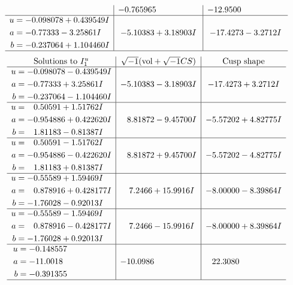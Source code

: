 \documentclass[1p]{elsarticle_modified}
\theoremstyle{definition}
\newcommand{\I}{\sqrt{-1}}
\begin{document}
$$\begin{array}{c|c|c}
 & -0.765965\phantom{ +0.000000I} & -12.9500\phantom{ +0.000000I} \\ \hline\begin{aligned}
u &= -0.098078 + 0.439549 I \\
a &= -0.77333 - 3.25861 I \\
b &= -0.237064 + 1.104460 I\end{aligned}
 & -5.10383 + 3.18903 I & -17.4273 - 3.2712 I\\
 \hline 
 \end{array}$$\newpage$$\begin{array}{c|c|c}  
\text{Solutions to }I^u_{1}& \I (\text{vol} + \sqrt{-1}CS) & \text{Cusp shape}\\
 \hline 
\begin{aligned}
u &= -0.098078 - 0.439549 I \\
a &= -0.77333 + 3.25861 I \\
b &= -0.237064 - 1.104460 I\end{aligned}
 & -5.10383 - 3.18903 I & -17.4273 + 3.2712 I \\ \hline\begin{aligned}
u &= \phantom{-}0.50591 + 1.51762 I \\
a &= -0.954886 + 0.422620 I \\
b &= \phantom{-}1.81183 - 0.81387 I\end{aligned}
 & \phantom{-}8.81872 - 9.45700 I & -5.57202 + 4.82775 I \\ \hline\begin{aligned}
u &= \phantom{-}0.50591 - 1.51762 I \\
a &= -0.954886 - 0.422620 I \\
b &= \phantom{-}1.81183 + 0.81387 I\end{aligned}
 & \phantom{-}8.81872 + 9.45700 I & -5.57202 - 4.82775 I \\ \hline\begin{aligned}
u &= -0.55589 + 1.59469 I \\
a &= \phantom{-}0.878916 + 0.428177 I \\
b &= -1.76028 - 0.92013 I\end{aligned}
 & \phantom{-}7.2466 + 15.9916 I & -8.00000 - 8.39864 I \\ \hline\begin{aligned}
u &= -0.55589 - 1.59469 I \\
a &= \phantom{-}0.878916 - 0.428177 I \\
b &= -1.76028 + 0.92013 I\end{aligned}
 & \phantom{-}7.2466 - 15.9916 I & -8.00000 + 8.39864 I \\ \hline\begin{aligned}
u &= -0.148557\phantom{ +0.000000I} \\
a &= -11.0018\phantom{ +0.000000I} \\
b &= -0.391355\phantom{ +0.000000I}\end{aligned}
 & -10.0986\phantom{ +0.000000I} & \phantom{-}22.3080\phantom{ +0.000000I}\\
 \hline 
 \end{array}$$\newpage\newpage\renewcommand{\arraystretch}{1}
\end{document}

